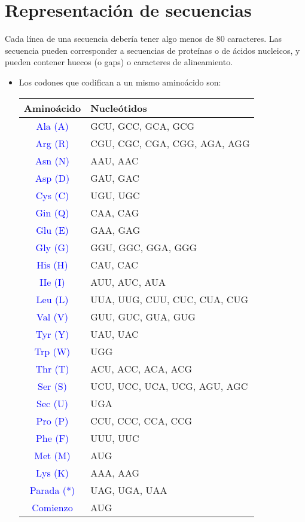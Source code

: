 \section{Representación de secuencias}	
\par Cada línea de una secuencia debería tener algo menos de 80 caracteres. Las secuencia pueden corresponder a secuencias de proteínas o de ácidos nucleicos, y pueden contener huecos (o gaps) o caracteres de alineamiento.
\begin{itemize}	
	\item Los codones que codifican a un mismo aminoácido son:
	\begin{center}
		\begin{tabular}{| c | l |}
			\hline
			{\bf Aminoácido} & {\bf Nucleótidos}\\
			\hline
			\hline		
			\textcolor{blue}{Ala (A)} & GCU, GCC, GCA, GCG  \\\hline
			\textcolor{blue}{Arg (R)} & CGU, CGC, CGA, CGG, AGA, AGG  \\\hline
			\textcolor{blue}{Asn (N)} & AAU, AAC  \\\hline
			\textcolor{blue}{Asp (D)} & GAU, GAC  \\\hline
			\textcolor{blue}{Cys (C)} & UGU, UGC  \\\hline
			\textcolor{blue}{Gin (Q)} & CAA, CAG  \\\hline
			\textcolor{blue}{Glu (E)} & GAA, GAG  \\\hline
			\textcolor{blue}{Gly (G)} & GGU, GGC, GGA, GGG \\\hline
			\textcolor{blue}{His (H)} & CAU, CAC \\\hline
			\textcolor{blue}{IIe (I)} & AUU, AUC, AUA \\\hline
			\textcolor{blue}{Leu (L)} & UUA, UUG, CUU, CUC, CUA, CUG \\\hline	
			\textcolor{blue}{Val (V)} & GUU, GUC, GUA, GUG \\\hline
			\textcolor{blue}{Tyr (Y)} & UAU, UAC \\\hline
			\textcolor{blue}{Trp (W)} & UGG \\\hline
			\textcolor{blue}{Thr (T)} & ACU, ACC, ACA, ACG \\\hline
			\textcolor{blue}{Ser (S)} & UCU, UCC, UCA, UCG, AGU, AGC  \\\hline
			\textcolor{blue}{Sec (U)} & UGA  \\\hline
			\textcolor{blue}{Pro (P)} & CCU, CCC, CCA, CCG \\\hline
			\textcolor{blue}{Phe (F)} & UUU, UUC \\\hline
			\textcolor{blue}{Met (M)} & AUG \\\hline
			\textcolor{blue}{Lys (K)} & AAA, AAG \\\hline
			\textcolor{blue}{Parada (*)} & UAG, UGA, UAA \\\hline
			\textcolor{blue}{Comienzo} & AUG \\\hline	
		\end{tabular}
	\end{center}		
\end{itemize}


